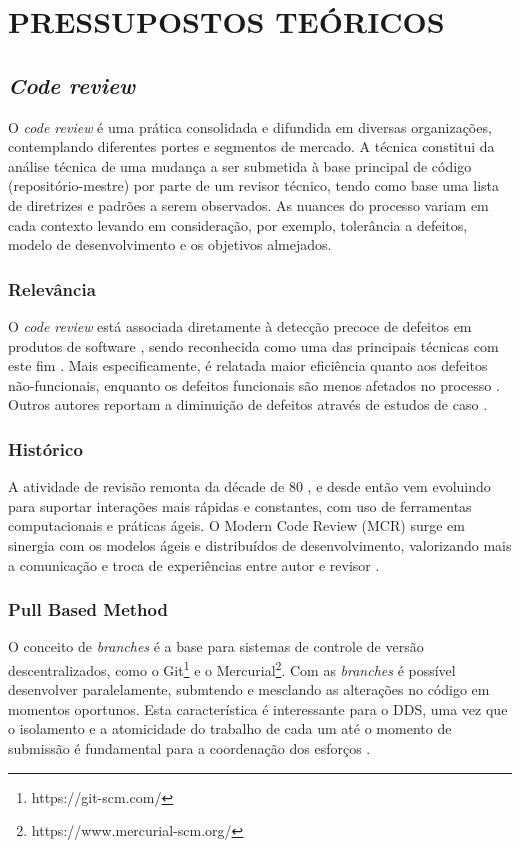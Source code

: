 \documentclass[preprint,review, 12pt]{elsarticle}
\begin{document}
\section{PRESSUPOSTOS TEÓRICOS}\label{chap:metodos}

  \subsection{\textit{Code review}}\label{sec:code_review}
    O \textit{code review} é uma prática consolidada e difundida em diversas organizações, contemplando diferentes portes e segmentos de mercado. A técnica constitui da análise técnica de uma mudança a ser submetida à base principal de código (repositório-mestre) por parte de um revisor técnico, tendo como base uma lista de diretrizes e padrões a serem observados. As nuances do processo variam em cada contexto levando em consideração, por exemplo, tolerância a defeitos, modelo de desenvolvimento e os objetivos almejados.

  \subsubsection{Relevância}\label{sec:relevancia}
    O \textit{code review} está associada diretamente à detecção precoce de defeitos em produtos de software \cite{schettino2014,Kemerer2009}, sendo reconhecida como uma das principais técnicas com este fim \cite{Boehm2001}. Mais especificamente, é relatada maior eficiência quanto aos defeitos não-funcionais, enquanto os defeitos funcionais são menos afetados no processo \cite{Beller2014202}. Outros autores reportam a diminuição de defeitos através de estudos de caso \cite{McIntosh2014192,Bavota201581,Morales2015171}.

  \subsubsection{Histórico}\label{sec:historico}
    A atividade de revisão remonta da décade de 80 \cite{Fagan1976}, e desde então vem evoluindo para suportar interações mais rápidas e constantes, com uso de ferramentas computacionais e práticas ágeis. O Modern Code Review (MCR) surge em sinergia com os modelos ágeis e distribuídos de desenvolvimento, valorizando mais a comunicação e troca de experiências entre autor e revisor \cite{Bacchelli2013}.

  \subsubsection{Pull Based Method}\label{sec:pull_based}
    O conceito de \textit{branches} é a base para sistemas de controle de versão descentralizados, como o  Git\footnote{https://git-scm.com/} e o Mercurial\footnote{https://www.mercurial-scm.org/}. Com as \textit{branches} é possível desenvolver paralelamente, submtendo e mesclando as alterações no código em momentos oportunos. Esta característica é interessante para o DDS, uma vez que o isolamento e a atomicidade do trabalho de cada um até o momento de submissão é fundamental para a coordenação dos esforços \cite{barr2012}.
\end{document}
